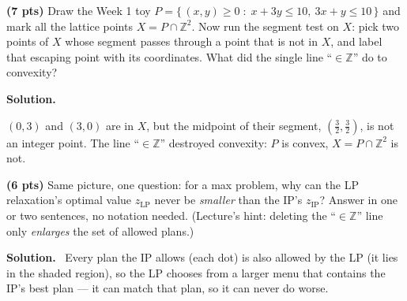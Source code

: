 \documentclass[10pt]{article}
\newenvironment{solution}
  {\par\smallskip\begingroup\color{solink}\textbf{Solution.}\ }
  {\endgroup\par}
\begin{document}
\begin{parts}
\item \textbf{(7 pts)} Draw the Week 1 toy
  $P = \{\, (x,y) \ge 0 \;:\; x + 3y \le 10, \ 3x + y \le 10 \,\}$ and mark all the
  lattice points $X = P \cap \mathbb{Z}^2$. Now run the segment test on $X$: pick
  two points of $X$ whose segment passes through a point that is not in $X$, and
  label that escaping point with its coordinates. What did the single line
  ``$\in \mathbb{Z}$'' do to convexity?

\begin{solution}
\par\medskip
\begin{center}
\end{center}
$(0,3)$ and $(3,0)$ are in $X$, but the midpoint of their segment, $(\tfrac32,\tfrac32)$,
is not an integer point. The line ``$\in \mathbb{Z}$'' destroyed convexity: $P$ is
convex, $X = P \cap \mathbb{Z}^2$ is not.
\end{solution}

\item \textbf{(6 pts)} Same picture, one question: for a max problem, why can the
  LP relaxation's optimal value $z_{\mathrm{LP}}$ never be \emph{smaller} than the
  IP's $z_{\mathrm{IP}}$? Answer in one or two sentences, no notation needed.
  (Lecture's hint: deleting the ``$\in \mathbb{Z}$'' line only \emph{enlarges} the
  set of allowed plans.)

\begin{solution}
Every plan the IP allows (each dot) is also allowed by the LP (it lies in the shaded
region), so the LP chooses from a larger menu that contains the IP's best plan --- it
can match that plan, so it can never do worse.
\end{solution}
\end{parts}
\end{document}
